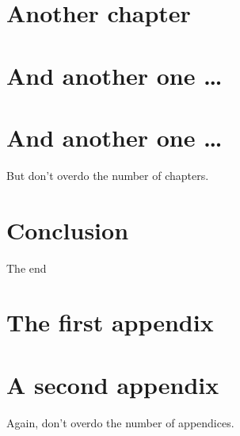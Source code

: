 \documentclass[a4paper,oneside,11pt]{report}
\begin{document}
\chapter{Another chapter}

\chapter{And another one \ldots}

\chapter{And another one \ldots}

But don't overdo the number of chapters.

\chapter{Conclusion}

The end

% 
% 


\appendix


\chapter{The first appendix}

\chapter{A second appendix}

Again, don't overdo the number of appendices.



\end{document}
